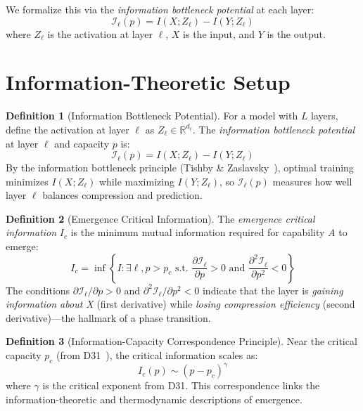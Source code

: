 \documentclass[12pt]{article}
\theoremstyle{definition}
\newtheorem{definition}{Definition}[section]
\theoremstyle{remark}
\begin{document}
We formalize this via the \emph{information bottleneck potential} at each layer:
\begin{equation}
\mathcal{I}_\ell(p) = I(X; Z_\ell) - I(Y; Z_\ell)
\end{equation}
where $Z_\ell$ is the activation at layer $\ell$, $X$ is the input, and $Y$ is the output.

\section{Information-Theoretic Setup}

\begin{definition}[Information Bottleneck Potential]
For a model with $L$ layers, define the activation at layer $\ell$ as $Z_\ell \in \mathbb{R}^{d_\ell}$. The \emph{information bottleneck potential} at layer $\ell$ and capacity $p$ is:
\begin{equation}
\mathcal{I}_\ell(p) = I(X; Z_\ell) - I(Y; Z_\ell)
\end{equation}
By the information bottleneck principle (Tishby \& Zaslavsky~\cite{tishby2015information}), optimal training minimizes $I(X; Z_\ell)$ while maximizing $I(Y; Z_\ell)$, so $\mathcal{I}_\ell(p)$ measures how well layer $\ell$ balances compression and prediction.
\end{definition}

\begin{definition}[Emergence Critical Information]
The \emph{emergence critical information} $I_c$ is the minimum mutual information required for capability $A$ to emerge:
\begin{equation}
I_c = \inf \left\{ I : \exists \ell, p > p_c \text{ s.t. } \frac{\partial \mathcal{I}_\ell}{\partial p} > 0 \text{ and } \frac{\partial^2 \mathcal{I}_\ell}{\partial p^2} < 0 \right\}
\end{equation}
The conditions $\partial \mathcal{I}_\ell / \partial p > 0$ and $\partial^2 \mathcal{I}_\ell / \partial p^2 < 0$ indicate that the layer is \emph{gaining information about X} (first derivative) while \emph{losing compression efficiency} (second derivative)---the hallmark of a phase transition.
\end{definition}

\begin{definition}[Information-Capacity Correspondence Principle]
Near the critical capacity $p_c$ (from D31~\cite{lu2026-d31}), the critical information scales as:
\begin{equation}
I_c(p) \sim (p - p_c)^\gamma
\end{equation}
where $\gamma$ is the critical exponent from D31. This correspondence links the information-theoretic and thermodynamic descriptions of emergence.
\end{definition}
\end{document}
